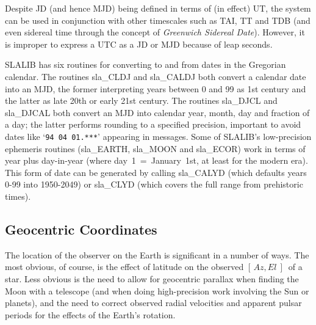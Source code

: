 \documentclass[11pt,twoside]{article}
\newcommand{\azel}      {$[\,Az,El~]$}
\begin{document}
Despite JD (and hence MJD) being defined in terms of (in effect)
UT, the system can be used in conjunction with other timescales
such as TAI, TT and TDB (and even sidereal time through the
concept of {\it Greenwich Sidereal Date}).  However, it is improper
to express a UTC as a JD or MJD because of leap seconds.

SLALIB has six routines for converting to and from dates in
the Gregorian calendar.  The routines
sla\_CLDJ
and
sla\_CALDJ
both convert a calendar date into an MJD, the former interpreting
years between 0 and 99 as 1st century and the latter as late 20th or
early 21st century.  The routines sla\_DJCL
and
sla\_DJCAL
both convert an MJD into calendar year, month, day and fraction of a day;
the latter performs rounding to a specified precision, important
to avoid dates like `{\tt 94 04 01.***}' appearing in messages.
Some of SLALIB's low-precision ephemeris routines
(sla\_EARTH,
sla\_MOON
and
sla\_ECOR)
work in terms of year plus day-in-year (where
day~1~=~January~1st, at least for the modern era).
This form of date can be generated by
calling
sla\_CALYD
(which defaults years 0-99 into 1950-2049)
or
sla\_CLYD
(which covers the full range from prehistoric times).

\subsection{Geocentric Coordinates}
The location of the observer on the Earth is significant in a
number of ways.  The most obvious, of course, is the effect of latitude
on the observed \azel\ of a star.  Less obvious is the need to
allow for geocentric parallax when finding the Moon with a
telescope (and when doing high-precision work involving the
Sun or planets), and the need to correct observed radial
velocities and apparent pulsar periods for the effects
of the Earth's rotation.
\end{document}
